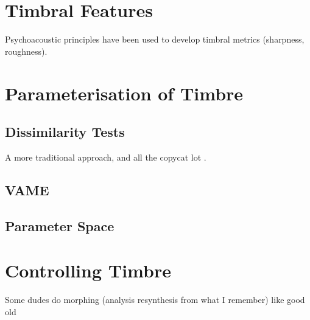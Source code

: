 \section{Timbral Features}
\label{sec:Timbre-TimbralFeatures}
	\note
	{
		Psychoacoustic principles have been used to develop timbral metrics (sharpness, roughness).
	}

\section{Parameterisation of Timbre}
\label{sec:Timbre-Parameterisation}

	\subsection{Dissimilarity Tests}
	\label{sec:Timbre-Dissimilarity}
		\note
		{
			A more traditional approach, \citet{grey1977multidimensional} and all the copycat lot 
			\citep{burgoyne2008a, caclin2005acoustic}.
		}

	\subsection{VAME}
	\label{sec:Timbre-VAME}

	\subsection{Parameter Space}
	\label{sec:Timbre-ParameterSpaces}

\section{Controlling Timbre}
\label{sec:Timbre-Control}
	
	\note
	{
		Some dudes do morphing (analysis resynthesis from what I remember) like good old 
		\citet{williams2007perceptually, williams2009perceptually, williams2010perceptually}
	}
